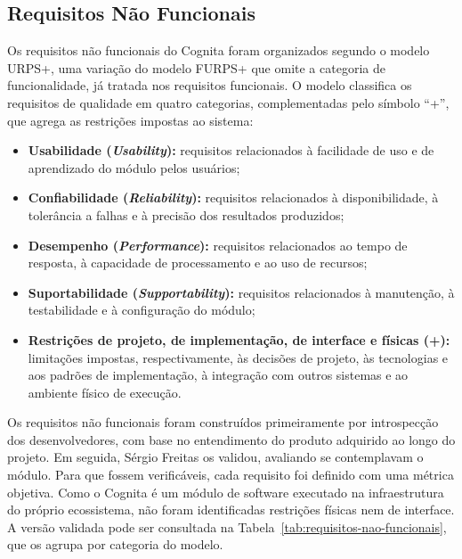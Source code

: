 \subsection{Requisitos Não Funcionais}
\label{subsec:requisitos-nao-funcionais}

Os requisitos não funcionais do Cognita foram organizados segundo o modelo URPS+, uma variação do modelo FURPS+ \cite{pressman_engenharia_2021} que omite a categoria de funcionalidade, já tratada nos requisitos funcionais. O modelo classifica os requisitos de qualidade em quatro categorias, complementadas pelo símbolo ``+'', que agrega as restrições impostas ao sistema:

\begin{itemize}
    \item \textbf{Usabilidade (\textit{Usability}):} requisitos relacionados à facilidade de uso e de aprendizado do módulo pelos usuários;
    \item \textbf{Confiabilidade (\textit{Reliability}):} requisitos relacionados à disponibilidade, à tolerância a falhas e à precisão dos resultados produzidos;
    \item \textbf{Desempenho (\textit{Performance}):} requisitos relacionados ao tempo de resposta, à capacidade de processamento e ao uso de recursos;
    \item \textbf{Suportabilidade (\textit{Supportability}):} requisitos relacionados à manutenção, à testabilidade e à configuração do módulo;
    \item \textbf{Restrições de projeto, de implementação, de interface e físicas (+):} limitações impostas, respectivamente, às decisões de projeto, às tecnologias e aos padrões de implementação, à integração com outros sistemas e ao ambiente físico de execução.
\end{itemize}

Os requisitos não funcionais foram construídos primeiramente por introspecção dos desenvolvedores, com base no entendimento do produto adquirido ao longo do projeto. Em seguida, Sérgio Freitas os validou, avaliando se contemplavam o módulo. Para que fossem verificáveis, cada requisito foi definido com uma métrica objetiva. Como o Cognita é um módulo de software executado na infraestrutura do próprio ecossistema, não foram identificadas restrições físicas nem de interface. A versão validada pode ser consultada na Tabela~\ref{tab:requisitos-nao-funcionais}, que os agrupa por categoria do modelo.

